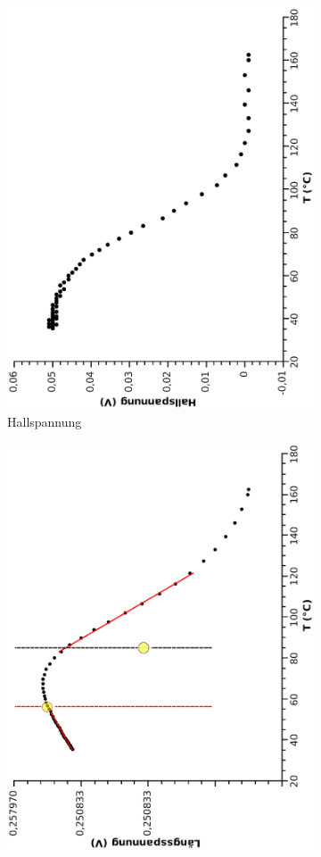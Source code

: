 \documentclass[12pt,a4paper,twopage]{article}
\begin{document}
\begin{figure}
\begin{subfigure}{0.4\textwidth}
\includegraphics[width=0.9\linewidth, angle=-90]{temphall.eps}
\caption{Hallspannung}
\end{subfigure}
\begin{subfigure}{0.4\textwidth}
\includegraphics[width=0.9\linewidth, angle=-90]{templangs.eps}

\end{subfigure}
\end{figure}
\end{document}

